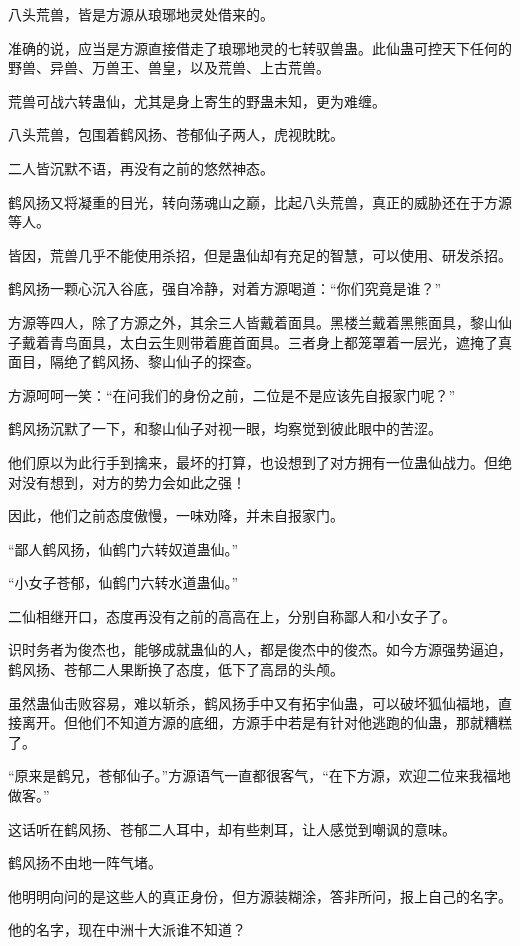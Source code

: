 \begin{this_body}
八头荒兽，皆是方源从琅琊地灵处借来的。

准确的说，应当是方源直接借走了琅琊地灵的七转驭兽蛊。此仙蛊可控天下任何的野兽、异兽、万兽王、兽皇，以及荒兽、上古荒兽。

荒兽可战六转蛊仙，尤其是身上寄生的野蛊未知，更为难缠。

八头荒兽，包围着鹤风扬、苍郁仙子两人，虎视眈眈。

二人皆沉默不语，再没有之前的悠然神态。

鹤风扬又将凝重的目光，转向荡魂山之巅，比起八头荒兽，真正的威胁还在于方源等人。

皆因，荒兽几乎不能使用杀招，但是蛊仙却有充足的智慧，可以使用、研发杀招。

鹤风扬一颗心沉入谷底，强自冷静，对着方源喝道：“你们究竟是谁？”

方源等四人，除了方源之外，其余三人皆戴着面具。黑楼兰戴着黑熊面具，黎山仙子戴着青鸟面具，太白云生则带着鹿首面具。三者身上都笼罩着一层光，遮掩了真面目，隔绝了鹤风扬、黎山仙子的探查。

方源呵呵一笑：“在问我们的身份之前，二位是不是应该先自报家门呢？”

鹤风扬沉默了一下，和黎山仙子对视一眼，均察觉到彼此眼中的苦涩。

他们原以为此行手到擒来，最坏的打算，也设想到了对方拥有一位蛊仙战力。但绝对没有想到，对方的势力会如此之强！

因此，他们之前态度傲慢，一味劝降，并未自报家门。

“鄙人鹤风扬，仙鹤门六转奴道蛊仙。”

“小女子苍郁，仙鹤门六转水道蛊仙。”

二仙相继开口，态度再没有之前的高高在上，分别自称鄙人和小女子了。

识时务者为俊杰也，能够成就蛊仙的人，都是俊杰中的俊杰。如今方源强势逼迫，鹤风扬、苍郁二人果断换了态度，低下了高昂的头颅。

虽然蛊仙击败容易，难以斩杀，鹤风扬手中又有拓宇仙蛊，可以破坏狐仙福地，直接离开。但他们不知道方源的底细，方源手中若是有针对他逃跑的仙蛊，那就糟糕了。

“原来是鹤兄，苍郁仙子。”方源语气一直都很客气，“在下方源，欢迎二位来我福地做客。”

这话听在鹤风扬、苍郁二人耳中，却有些刺耳，让人感觉到嘲讽的意味。

鹤风扬不由地一阵气堵。

他明明向问的是这些人的真正身份，但方源装糊涂，答非所问，报上自己的名字。

他的名字，现在中洲十大派谁不知道？


\end{this_body}
